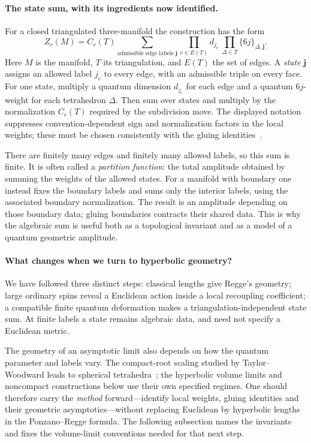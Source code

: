 \paragraph{The state sum, with its ingredients now identified.}
For a closed triangulated three-manifold the construction has the form
\begin{equation}
 Z_r(M)=C_r(T)\sum_{\text{admissible edge labels }\mathbf j}
       \prod_{e\in E(T)}d_{j_e}\,
       \prod_{\Delta\in T}\{6j\}_{\Delta,\mathbf j}.
 \label{eq:introstatesum}
\end{equation}
Here $M$ is the manifold, $T$ its triangulation, and $E(T)$ the
set of edges. A \emph{state} $\mathbf j$ assigns an allowed label
$j_e$ to every edge, with an admissible triple on every face.
For one state, multiply a quantum dimension $d_{j_e}$ for each
edge and a quantum $6j$-weight for each tetrahedron $\Delta$.
Then sum over states and multiply by the normalization $C_r(T)$
required by the subdivision move. The displayed notation suppresses
convention-dependent sign and normalization factors in the local
weights; these must be chosen consistently with the gluing
identities~\cite{TuraevViro1992}\cite[Sections 2.2--2.3]{ChenYang}.

There are finitely many edges and finitely many allowed labels,
so this sum is finite. It is often called a \emph{partition
function}: the total amplitude obtained by summing the weights
of the allowed states. For a manifold with boundary one instead
fixes the boundary labels and sums only the interior labels,
using the associated boundary normalization. The result is an
amplitude depending on those boundary data; gluing boundaries
contracts their shared data. This is why the algebraic sum is
useful both as a topological invariant and as a model of a quantum
geometric amplitude.

\paragraph{What changes when we turn to hyperbolic geometry?}
We have followed three distinct steps: classical lengths give
Regge's geometry; large ordinary spins reveal a Euclidean action
inside a local recoupling coefficient; a compatible finite
quantum deformation makes a triangulation-independent state sum.
At finite labels a state remains algebraic data, and need not
specify a Euclidean metric.

The geometry of an asymptotic limit also depends on how the quantum
parameter and labels vary. The compact-root scaling studied by
Taylor--Woodward leads to spherical tetrahedra~\cite{TaylorWoodward};
the hyperbolic volume limits and noncompact constructions below
use their own specified regimes. One should therefore carry the
\emph{method} forward---identify local weights, gluing identities
and their geometric asymptotics---without replacing Euclidean by
hyperbolic lengths in the Ponzano--Regge formula. The following
subsection names the invariants and fixes the volume-limit
conventions needed for that next step.


